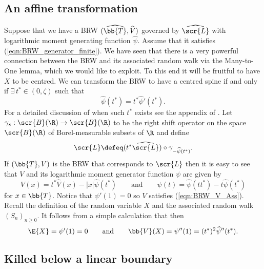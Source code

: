 \subsection{An affine transformation}

Suppose that we have a BRW $(\widehat{\bb{T}}, \widehat{V})$ governed by $\widehat{\scr{L}}$ with logarithmic moment generating function $\widehat{\psi}$. Assume that it satisfies (\ref{eqn:BRW_generator_finite}). We have seen that there is a very powerful connection between the BRW and its associated random walk via the Many-to-One lemma, which we would like to exploit. To this end it will be fruitful to have $X$ to be centred. We can transform the BRW to have a centred spine if and only if $\exists\, t^* \in (0, \zeta)$ such that
\begin{equation}\label{eqn:t*exists}
\widehat{\psi} (t^*) = t^* \widehat{\psi}'(t^*). 
\end{equation}
For a detailed discussion of when such $t^*$ exists see the appendix of \cite{jaffuel2227critical}. Let $\gamma_s : \scr{B}(\R) \to \scr{B}(\R)$ to be the right shift operator on the space $\scr{B}(\R)$ of Borel-measurable subsets of $\R$ and define
\begin{equation}\label{eqn:transformation}
\scr{L} \defeq (t^* \widehat{\scr{L}}) \circ \gamma_{- \widehat{\psi}(t^*)}. 
\end{equation}
If $(\bb{T}, V)$ is the BRW that corresponds to $\scr{L}$ then it is easy to see that $V$ and its logarithmic moment generator function $\psi$ are given by 
\begin{equation}\label{eqn:transformation2}
V(x) = t^* \widehat{V}(x) - |x| \widehat{\psi}(t^*) \qquad\text{and}\qquad \psi(t) = \widehat{\psi}(t t^*) -t \widehat{\psi}(t^*) 
\end{equation}
for $x \in \bb{T}$. Notice that $\psi'(1) = 0$ so $V$ satisfies (\ref{eqn:BRW_V_Ass}). Recall the definition of the random variable $X$ and the associated random walk $(S_n)_{n \geq 0}$. It follows from a simple calculation that then 
\begin{equation}\label{eqn:RWCentred}
\E{X} = \psi'(1) = 0 \qquad\text{and}\qquad \bb{V}(X) = \psi''(1) = (t^*)^2 \widehat{\psi}''(t^*). 
\end{equation}





\subsection{Killed below a linear boundary}

